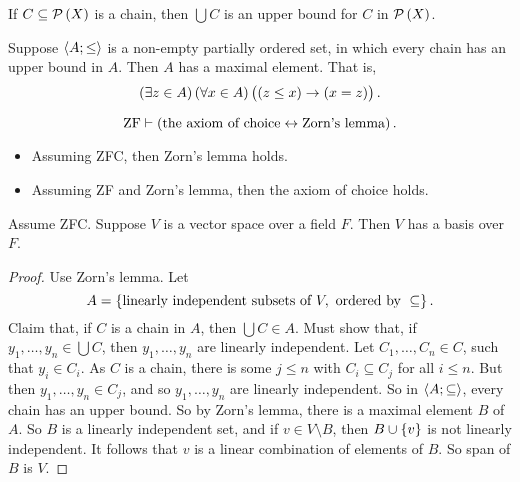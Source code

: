 \begin{example*}
If $ C \subseteq \PPP\br{X} $ is a chain, then $ \bigcup C $ is an upper bound for $ C $ in $ \PPP\br{X} $.
\end{example*}

\begin{definition}
Suppose $ \left\langle A; \le \right\rangle $ is a non-empty partially ordered set, in which every chain has an upper bound in $ A $. Then $ A $ has a maximal element. That is,
$$ \teb{z \in A}\fab{x \in A}\impb{\leb{z}{x}}{\eqb{x}{z}}. $$
\end{definition}

\begin{theorem}
\label{thm:4.3.2}
$$ \text{ZF} \vdash \iffb{\text{the axiom of choice}}{\text{Zorn's lemma}}. $$
\begin{itemize}
\item Assuming ZFC, then Zorn's lemma holds.
\item Assuming ZF and Zorn's lemma, then the axiom of choice holds.
\end{itemize}
\end{theorem}

\begin{example}
Assume ZFC. Suppose $ V $ is a vector space over a field $ F $. Then $ V $ has a basis over $ F $.
\end{example}

\begin{proof}
Use Zorn's lemma. Let
$$ A = \cbr{\text{linearly independent subsets of} \ V, \ \text{ordered by} \ \subseteq}. $$
Claim that, if $ C $ is a chain in $ A $, then $ \bigcup C \in A $. Must show that, if $ y_1, \dots, y_n \in \bigcup C $, then $ y_1, \dots, y_n $ are linearly independent. Let $ C_1, \dots, C_n \in C $, such that $ y_i \in C_i $. As $ C $ is a chain, there is some $ j \le n $ with $ C_i \subseteq C_j $ for all $ i \le n $. But then $ y_1, \dots, y_n \in C_j $, and so $ y_1, \dots, y_n $ are linearly independent. So in $ \left\langle A; \subseteq \right\rangle $, every chain has an upper bound. So by Zorn's lemma, there is a maximal element $ B $ of $ A $. So $ B $ is a linearly independent set, and if $ v \in V \setminus B $, then $ B \cup \cbr{v} $ is not linearly independent. It follows that $ v $ is a linear combination of elements of $ B $. So span of $ B $ is $ V $.
\end{proof}

